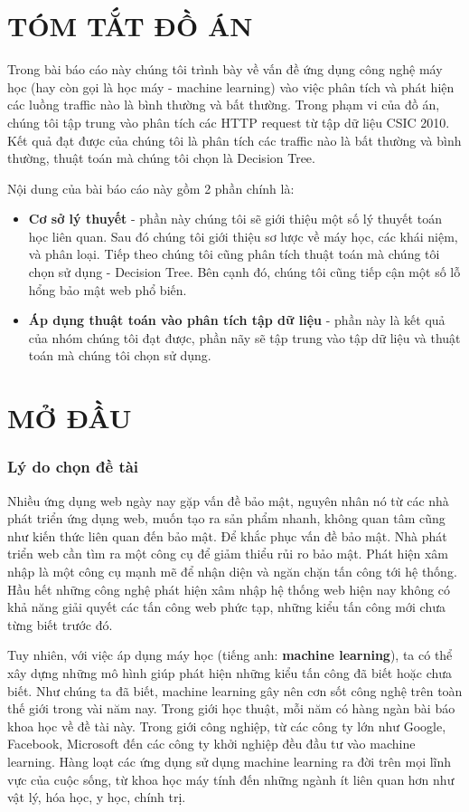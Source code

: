 \documentclass[../main-report.tex]{subfiles}
\begin{document}
\part*{TÓM TẮT ĐỒ ÁN}
Trong bài báo cáo này chúng tôi trình bày về vấn đề ứng dụng công nghệ máy học (hay còn gọi là học máy - machine learning) vào việc phân tích và phát hiện các luồng traffic nào là bình thường và bất thường. Trong phạm vi của đồ án, chúng tôi tập trung vào phân tích các HTTP request từ tập dữ liệu CSIC 2010. Kết quả đạt được của chúng tôi là phân tích các traffic nào là bất thường và bình thường, thuật toán mà chúng tôi chọn là Decision Tree.

Nội dung của bài báo cáo này gồm 2 phần chính là:

\begin{itemize}
\item \textbf{Cơ sở lý thuyết} - phần này chúng tôi sẽ giới thiệu một số lý thuyết toán học liên quan. Sau đó chúng tôi giới thiệu sơ lược về máy học, các khái niệm, và phân loại. Tiếp theo chúng tôi cũng phân tích thuật toán mà chúng tôi chọn sử dụng - Decision Tree. Bên cạnh đó, chúng tôi cũng tiếp cận một số lỗ hổng bảo mật web phổ biến.
\item \textbf{Áp dụng thuật toán vào phân tích tập dữ liệu} - phần này là kết quả của nhóm chúng tôi đạt được, phần nãy sẽ tập trung vào tập dữ liệu và thuật toán mà chúng tôi chọn sử dụng.
\end{itemize}

\newpage
\part*{MỞ ĐẦU}
\section*{Lý do chọn đề tài}
Nhiều ứng dụng web ngày nay gặp vấn đề bảo mật, nguyên nhân nó từ các nhà phát triển ứng dụng web, muốn tạo ra sản phẩm nhanh, không quan tâm cũng như kiến thức liên quan đến bảo mật. Để khắc phục vấn đề bảo mật. Nhà phát triển web cần tìm ra một công cụ để giảm thiểu rủi ro bảo mật. Phát hiện xâm nhập là một công cụ mạnh mẽ để nhận diện và ngăn chặn tấn công tới hệ thống. Hầu hết những công nghệ phát hiện xâm nhập hệ thống web hiện nay không có khả năng giải quyết các tấn công web phức tạp, những kiểu tấn công mới chưa từng biết trước đó.

Tuy nhiên, với việc áp dụng máy học (tiếng anh: \textbf{machine learning}), ta có thể xây dựng những mô hình giúp phát hiện những kiểu tấn công đã biết hoặc chưa biết. Như chúng ta đã biết, machine learning gây nên cơn sốt công nghệ trên toàn thế giới trong vài năm nay. Trong giới học thuật, mỗi năm có hàng ngàn bài báo khoa học về đề tài này. Trong giới công nghiệp, từ các công ty lớn như Google, Facebook, Microsoft đến các công ty khởi nghiệp đều đầu tư vào machine learning. Hàng loạt các ứng dụng sử dụng machine learning ra đời trên mọi lĩnh vực của cuộc sống, từ khoa học máy tính đến những ngành ít liên quan hơn như vật lý, hóa học, y học, chính trị.
\end{document}
